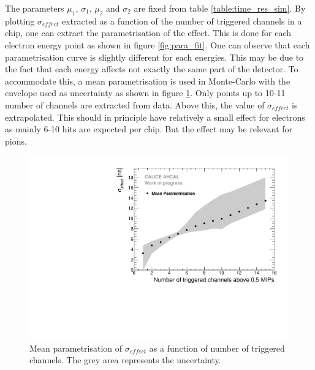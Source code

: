 The parameters $\mu_1$, $\sigma_1$, $\mu_2$ and $\sigma_2$ are fixed from table \ref{table:time_res_sim}. By plotting $\sigma_{effect}$ extracted as a function of the number of triggered channels in a chip, one can extract the parametrisation of the effect. This is done for each electron energy point as shown in figure \ref{fig:para_fit}. One can observe that each parametrisation curve is slightly different for each energies. This may be due to the fact that each energy affects not exactly the same part of the detector. To accommodate this, a mean parametrisation is used in Monte-Carlo with the envelope used as uncertainty as shown in figure \ref{fig:mean_para}. Only points up to 10-11 number of channels are extracted from data. Above this, the value of $\sigma_{effect}$ is extrapolated. This should in principle have relatively a small effect for electrons as mainly 6-10 hits are expected per chip. But the effect may be relevant for pions.

\begin{figure}[htbp!]
	\centering
	\includegraphics[width=0.7\linewidth]{../Thesis_Plots/Timing/Electrons/Plots/MeanParametrisationWithSystErrors.pdf}
	\caption{Mean parametrisation of $\sigma_{effect}$ as a function of number of triggered channels. The grey area represents the uncertainty.}
	\label{fig:mean_para}
\end{figure}

